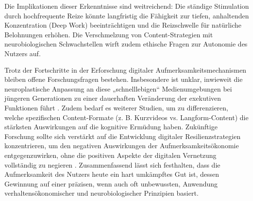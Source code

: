 \documentclass[11pt,a4paper]{article}
\begin{document}
Die Implikationen dieser Erkenntnisse sind weitreichend: Die ständige Stimulation durch hochfrequente Reize könnte langfristig die Fähigkeit zur tiefen, anhaltenden Konzentration (Deep Work) beeinträchtigen und die Reizschwelle für natürliche Belohnungen erhöhen. Die Verschmelzung von Content-Strategien mit neurobiologischen Schwachstellen wirft zudem ethische Fragen zur Autonomie des Nutzers auf.

Trotz der Fortschritte in der Erforschung digitaler Aufmerksamkeitsmechanismen bleiben offene Forschungsfragen bestehen. Insbesondere ist unklar, inwieweit die neuroplastische Anpassung an diese „schnelllebigen“ Medienumgebungen bei jüngeren Generationen zu einer dauerhaften Veränderung der exekutiven Funktionen führt . Zudem bedarf es weiterer Studien, um zu differenzieren, welche spezifischen Content-Formate (z. B. Kurzvideos vs. Langform-Content) die stärksten Auswirkungen auf die kognitive Ermüdung haben. Zukünftige Forschung sollte sich verstärkt auf die Entwicklung digitaler Resilienzstrategien konzentrieren, um den negativen Auswirkungen der Aufmerksamkeitsökonomie entgegenzuwirken, ohne die positiven Aspekte der digitalen Vernetzung vollständig zu negieren . Zusammenfassend lässt sich festhalten, dass die Aufmerksamkeit des Nutzers heute ein hart umkämpftes Gut ist, dessen Gewinnung auf einer präzisen, wenn auch oft unbewussten, Anwendung verhaltensökonomischer und neurobiologischer Prinzipien basiert.
\appendix
\end{document}
